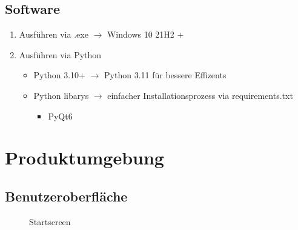 \documentclass{article}
\begin{document}
\subsection{Software}
\begin{enumerate}
    \item Ausführen via .exe $\rightarrow$ Windows 10 21H2 +
    \item Ausführen via Python
        \begin{itemize}
            \item Python 3.10+ $\rightarrow$ Python 3.11 für bessere Effizents
            \item Python libarys $\rightarrow$ einfacher Installationsprozess via requirements.txt
                \begin{itemize}
                    \item PyQt6
                \end{itemize}
        \end{itemize}
\end{enumerate}



\newpage
\section{Produktumgebung}\label{section-product}

\subsection{Benutzeroberfläche}

\begin{figure}[h]
    \centering
    \caption{Startscreen}
\end{figure}
\end{document}
